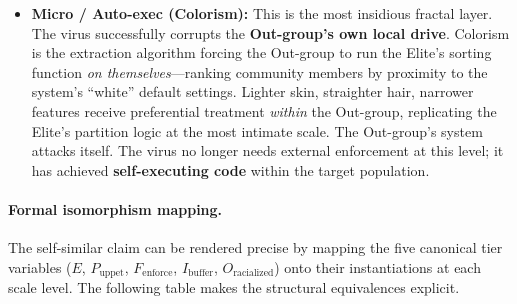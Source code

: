 \documentclass[12pt,openany]{book}
\begin{document}
\begin{itemize}
    \item \textbf{Micro / Auto-exec (Colorism):} This is the most insidious fractal layer. The virus successfully corrupts the \textbf{Out-group's own local drive}. Colorism is the extraction algorithm forcing the Out-group to run the Elite's sorting function \textit{on themselves}---ranking community members by proximity to the system's ``white'' default settings. Lighter skin, straighter hair, narrower features receive preferential treatment \textit{within} the Out-group, replicating the Elite's partition logic at the most intimate scale. The Out-group's system attacks itself. The virus no longer needs external enforcement at this level; it has achieved \textbf{self-executing code} within the target population.
\end{itemize}

\paragraph{Formal isomorphism mapping.}
The self-similar claim can be rendered precise by mapping the five canonical tier variables ($E$, $P_{\text{uppet}}$, $F_{\text{enforce}}$, $I_{\text{buffer}}$, $O_{\text{racialized}}$) onto their instantiations at each scale level. The following table makes the structural equivalences explicit.
\end{document}
